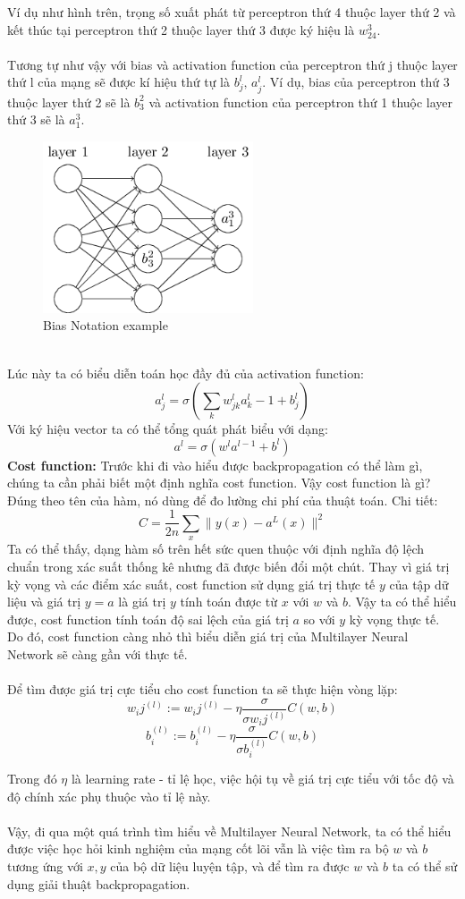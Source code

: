 Ví dụ như hình trên, trọng số xuất phát từ perceptron thứ 4 thuộc layer thứ 
2 và kết thúc tại perceptron thứ 2 thuộc layer thứ 3 được ký hiệu là 
$w_{24}^3$.\\\\
Tương tự như vậy với bias và activation function của perceptron thứ j thuộc layer 
thứ l của mạng sẽ được kí hiệu thứ tự là $b_j^l,\,a_j^l$. Ví dụ, bias của perceptron 
thứ 3 thuộc layer thứ 2 sẽ là $b_3^2$ và activation function của perceptron thứ 
1 thuộc layer thứ 3 sẽ là $a_1^3$.\\
\begin{figure}[h!]
\centering
\includegraphics[height=2in, keepaspectratio=true]{exb.png}
\caption{Bias Notation example}
\end{figure}\\
Lúc này ta có biểu diễn toán học đầy đủ của activation function:\\
\[
  a_j^l=\sigma(\sum_k w_{jk}^l a_k^l-1 + b_j^l)
\]
Với ký hiệu vector ta có thể tổng quát phát biểu với dạng:\\
\[
  a^l=\sigma(w^l a^{l-1} + b^l)
\]
\textbf{Cost function:} Trước khi đi vào hiểu được backpropagation có thể làm gì, 
chúng ta cần phải biết một định nghĩa cost function. Vậy cost function là gì? 
Đúng theo tên của hàm, nó dùng để đo lường chi phí của thuật toán. Chi tiết:\\
\[
  C=\frac{1}{2n}\sum_x\|y(x)-a^L(x)\|^2
\]
Ta có thể thấy, dạng hàm số trên hết sức quen thuộc với định nghĩa độ lệch chuẩn 
trong xác suất thống kê nhưng đã được biến đổi một chút. Thay vì giá trị kỳ vọng 
và các điểm xác suất, cost function sử dụng giá trị thực tế $y$ của tập dữ liệu 
và giá trị $y=a$ là giá trị $y$ tính toán được từ $x$ với $w$ và $b$. Vậy ta 
có thể hiểu được, cost function tính toán độ sai lệch của giá trị $a$ so với 
$y$ kỳ vọng thực tế. Do đó, cost function càng nhỏ thì biểu diễn giá trị của 
Multilayer Neural Network sẽ càng gần với thực tế.\\\\
Để tìm được giá trị cực tiểu cho cost function ta sẽ thực hiện vòng lặp:\\
\[
  w_ij^{(l)}:=w_ij^{(l)}-\eta\frac{\sigma}{\sigma w_ij^{(l)}}C(w,b)
\]
\[
  b_i^{(l)}:=b_i^{(l)}-\eta\frac{\sigma}{\sigma b_i^{(l)}}C(w,b)
\]

Trong đó $\eta$ là learning rate - tỉ lệ học, việc hội tụ về giá trị cực tiểu với 
tốc độ và độ chính xác phụ thuộc vào tỉ lệ này.\\\\
Vậy, đi qua một quá trình tìm hiểu về Multilayer Neural Network, ta có thể hiểu 
được việc học hỏi kinh nghiệm của mạng cốt lõi vẫn là việc tìm ra bộ $w$ và $b$ 
tương ứng với ${x, y}$ của bộ dữ liệu luyện tập, và để tìm ra được $w$ và $b$ 
ta có thể sử dụng giải thuật backpropagation.